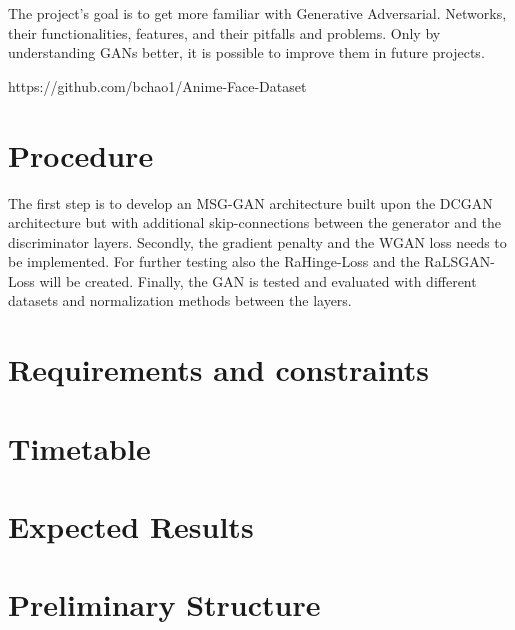 \documentclass[conference,onecolumn,compsoc]{IEEEtran}
\begin{document}
\noindent
The project's goal is to get more familiar with Generative Adversarial. Networks, their functionalities, features, and their pitfalls and problems. Only by understanding GANs better, it is possible to improve them in future projects.

https://github.com/bchao1/Anime-Face-Dataset


\section{Procedure}

\noindent
The first step is to develop an MSG-GAN \cite{karnewar2020msggan} architecture built upon the DCGAN \cite{radford2016unsupervised} architecture but with additional skip-connections between the generator and the discriminator layers. Secondly, the gradient penalty and the WGAN loss needs to be implemented. For further testing also the RaHinge-Loss and the RaLSGAN-Loss will be created. Finally, the GAN is tested and evaluated with different datasets and normalization methods between the layers.

\section{Requirements and constraints}

\blindtext

\section{Timetable}

\noindent
\blindtext \cite{yazıcı2019unusual}

\section{Expected Results}

\noindent
\blindtext


\section{Preliminary  Structure}
\end{document}
